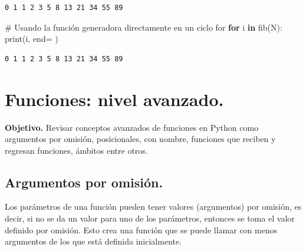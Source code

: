 \documentclass[
  spanish,
  letterpaper,
]{scrbook}
\newenvironment{Shaded}{\begin{snugshade}}{\end{snugshade}}
\newcommand{\BuiltInTok}[1]{\textcolor[rgb]{0.00,0.23,0.31}{#1}}
\newcommand{\CommentTok}[1]{\textcolor[rgb]{0.37,0.37,0.37}{#1}}
\newcommand{\ControlFlowTok}[1]{\textcolor[rgb]{0.00,0.23,0.31}{\textbf{#1}}}
\newcommand{\KeywordTok}[1]{\textcolor[rgb]{0.00,0.23,0.31}{\textbf{#1}}}
\newcommand{\NormalTok}[1]{\textcolor[rgb]{0.00,0.23,0.31}{#1}}
\newcommand{\OperatorTok}[1]{\textcolor[rgb]{0.37,0.37,0.37}{#1}}
\newcommand{\StringTok}[1]{\textcolor[rgb]{0.13,0.47,0.30}{#1}}
\theoremstyle{definition}
\theoremstyle{remark}
\begin{document}
\begin{verbatim}
0 1 1 2 3 5 8 13 21 34 55 89 
\end{verbatim}

\begin{Shaded}
\begin{Highlighting}[]
\CommentTok{\# Usando la función generadora directamente en un ciclo for}
\ControlFlowTok{for}\NormalTok{ i }\KeywordTok{in}\NormalTok{ fib(N): }
    \BuiltInTok{print}\NormalTok{(i, end}\OperatorTok{=}\StringTok{\textquotesingle{} \textquotesingle{}}\NormalTok{)}
\end{Highlighting}
\end{Shaded}

\begin{verbatim}
0 1 1 2 3 5 8 13 21 34 55 89 
\end{verbatim}

\chapter{Funciones: nivel avanzado.}\label{sec-v-funciones-avanzado}

\textbf{Objetivo.} Revisar conceptos avanzados de funciones en Python
como argumentos por omisión, posicionales, con nombre, funciones que
reciben y regresan funciones, ámbitos entre otros.

\section{Argumentos por omisión.}\label{argumentos-por-omisiuxf3n.}

Los parámetros de una función pueden tener valores (argumentos) por
omisión, es decir, si no se da un valor para uno de los parámetros,
entonces se toma el valor definido por omisión. Esto crea una función
que se puede llamar con menos argumentos de los que está definida
inicialmente.
\end{document}
